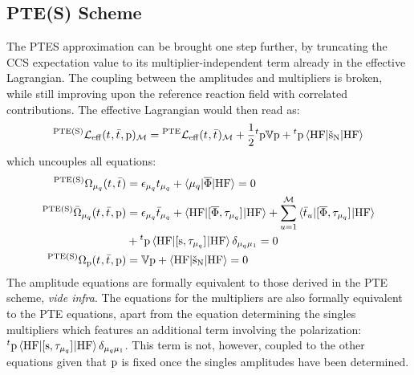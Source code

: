 \subsection*{PTE(S) Scheme}

The \acrshort{PTES} approximation can be brought one step further, by
truncating the \acrshort{CCS} expectation value to its multiplier-independent
term already in the effective Lagrangian.
The coupling between the amplitudes and multipliers is broken, while
still improving upon the reference reaction field with correlated
contributions.\autocite{Caricato2011-tx}
The effective Lagrangian would then read as:
\begin{equation}\label{eq:pte-s-cc}
    {}^{\mathrm{PTE(S)}}\mathcal{L}_\mathrm{eff}(t_{}, \bar{t}_{}, \mathrm{p})_\mathcal{M} =
  {}^\mathrm{PTE}\mathcal{L}_\mathrm{eff}(t_{}, \bar{t}_{})_\mathcal{M}
  + \frac{1}{2}{}^t\mathrm{p}\mathbb{V}\mathrm{p} + {}^t\mathrm{p}\braket{\mathrm{HF} | \check{\mathrm{s}}_{\mathrm{N}} | \mathrm{HF}}
\end{equation}
which uncouples all equations:
\begin{subequations}
  \begin{align}
  {}^{\mathrm{PTE(S)}}\Omega_{\mu_q}(t_{}, \bar{t}_{})  &=
   \epsilon_{\mu_q}t_{\mu_q} + \braket{\mu_q | \overline{\Phi} | \mathrm{HF}}
   = 0 \\
   {}^{\mathrm{PTE(S)}}\bar{\Omega}_{\mu_q}(t_{}, \bar{t}_{}, \mathrm{p}) &=
    \epsilon_{\mu_q}\bar{t}_{\mu_q} +
    \braket{\mathrm{HF} | [ \overline{\Phi}, \tau_{\mu_q} ]^{} | \mathrm{HF}} +
    \sum_{u=1}^{\mathcal{M}}\braket{\bar{t}_{u} |
    [ \overline{\Phi}, \tau_{\mu_q} ]^{} | \mathrm{HF}}
    \nonumber \\
    &+
    {}^t\mathrm{p}\braket{\mathrm{HF} | [ \mathrm{s}, \tau_{\mu_q} ]^{} | \mathrm{HF}}\delta_{\mu_q\mu_1}
    = 0 \\
    {}^{\mathrm{PTE(S)}}\Omega_{\mathrm{p}}(t_{}, \bar{t}_{}, \mathrm{p})
    &=
    \mathbb{V}\mathrm{p} + \braket{\mathrm{HF} | \check{\mathrm{s}}_{\mathrm{N}} | \mathrm{HF}} = 0
    \label{eq:pte-s-polarization}
  \end{align}
\end{subequations}
The amplitude equations are formally equivalent to those derived in the
\acrshort{PTE} scheme, \emph{vide infra}.
The equations for the multipliers are also formally equivalent to the
\acrshort{PTE} equations, apart from the equation determining the
singles multipliers which features an additional term involving the
polarization:
${}^t\mathrm{p}\braket{\mathrm{HF} | [ \mathrm{s}, \tau_{\mu_q} ]^{} | \mathrm{HF}}\delta_{\mu_q\mu_1}$.
This term is not, however, coupled to the other equations given that
$\mathrm{p}$ is fixed once the singles amplitudes have been determined.

